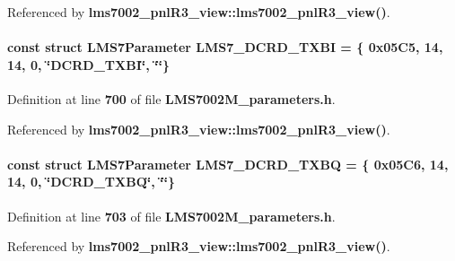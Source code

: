 Referenced by {\bf lms7002\+\_\+pnl\+R3\+\_\+view\+::lms7002\+\_\+pnl\+R3\+\_\+view()}.

\paragraph[{L\+M\+S7\+\_\+\+D\+C\+R\+D\+\_\+\+T\+X\+BI}]{\setlength{\rightskip}{0pt plus 5cm}const struct {\bf L\+M\+S7\+Parameter} L\+M\+S7\+\_\+\+D\+C\+R\+D\+\_\+\+T\+X\+BI = \{ 0x05\+C5, 14, 14, 0, \char`\"{}\+D\+C\+R\+D\+\_\+\+T\+X\+B\+I\char`\"{}, \char`\"{}\char`\"{}\}\hspace{0.3cm}{\ttfamily [static]}}\label{LMS7002M__parameters_8h_a37829a7e1aab97e3d8210fb07040d3c6}


Definition at line {\bf 700} of file {\bf L\+M\+S7002\+M\+\_\+parameters.\+h}.



Referenced by {\bf lms7002\+\_\+pnl\+R3\+\_\+view\+::lms7002\+\_\+pnl\+R3\+\_\+view()}.

\paragraph[{L\+M\+S7\+\_\+\+D\+C\+R\+D\+\_\+\+T\+X\+BQ}]{\setlength{\rightskip}{0pt plus 5cm}const struct {\bf L\+M\+S7\+Parameter} L\+M\+S7\+\_\+\+D\+C\+R\+D\+\_\+\+T\+X\+BQ = \{ 0x05\+C6, 14, 14, 0, \char`\"{}\+D\+C\+R\+D\+\_\+\+T\+X\+B\+Q\char`\"{}, \char`\"{}\char`\"{}\}\hspace{0.3cm}{\ttfamily [static]}}\label{LMS7002M__parameters_8h_a0ab4f9633baed3fc2eb77ba2fbc35d64}


Definition at line {\bf 703} of file {\bf L\+M\+S7002\+M\+\_\+parameters.\+h}.



Referenced by {\bf lms7002\+\_\+pnl\+R3\+\_\+view\+::lms7002\+\_\+pnl\+R3\+\_\+view()}.


